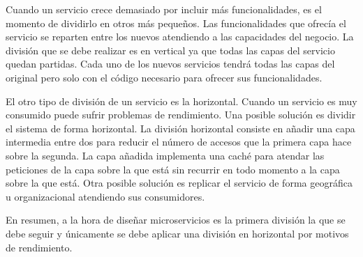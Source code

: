 \documentclass[11pt,a4paper]{article}
\begin{document}
Cuando un servicio crece demasiado por incluir más funcionalidades, es el momento de dividirlo en otros más pequeños. Las funcionalidades que ofrecía el servicio se reparten entre los nuevos atendiendo a las capacidades del negocio. La división que se debe realizar es en vertical ya que todas las capas del servicio quedan partidas. Cada uno de los nuevos servicios tendrá todas las capas del original pero solo con el código necesario para ofrecer sus funcionalidades.

El otro tipo de división de un servicio es la horizontal. Cuando un servicio es muy consumido puede sufrir problemas de rendimiento. Una posible solución es dividir el sistema de forma horizontal. La división horizontal consiste en añadir una capa intermedia entre dos para reducir el número de accesos que la primera capa hace sobre la segunda. La capa añadida implementa una caché para atendar las peticiones de la capa sobre la que está sin recurrir en todo momento a la capa sobre la que está. Otra posible solución es replicar el servicio de forma geográfica u organizacional atendiendo sus consumidores.

En resumen, a la hora de diseñar microservicios es la primera división la que se debe seguir y únicamente se debe aplicar una división en horizontal por motivos de rendimiento.
\end{document}
